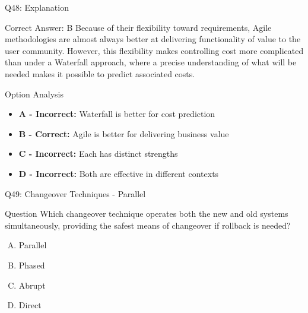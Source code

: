 \documentclass{beamer}
\begin{document}
	\begin{frame}{Q48: Explanation}
		\begin{block}{Correct Answer: B}
			Because of their flexibility toward requirements, Agile methodologies are almost always better at delivering functionality of value to the user community. However, this flexibility makes controlling cost more complicated than under a Waterfall approach, where a precise understanding of what will be needed makes it possible to predict associated costs.
		\end{block}
		\begin{block}{Option Analysis}
			\begin{itemize}
				\item \textbf{A - Incorrect:} Waterfall is better for cost prediction
				\item \textbf{B - Correct:} Agile is better for delivering business value
				\item \textbf{C - Incorrect:} Each has distinct strengths
				\item \textbf{D - Incorrect:} Both are effective in different contexts
			\end{itemize}
		\end{block}
	\end{frame}
	
	\begin{frame}{Q49: Changeover Techniques - Parallel}
		\begin{block}{Question}
			Which changeover technique operates both the new and old systems simultaneously, providing the safest means of changeover if rollback is needed?
		\end{block}
		\begin{enumerate}[(A)]
			\item Parallel
			\item Phased
			\item Abrupt
			\item Direct
		\end{enumerate}
	\end{frame}
	
\end{document}

